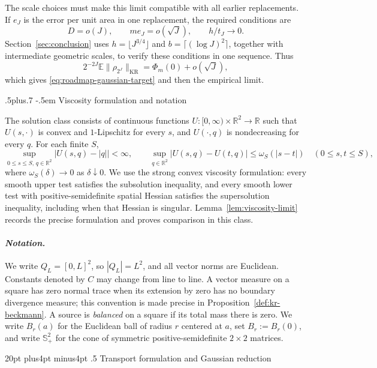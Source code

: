 \documentclass[11pt,reqno]{amsart}
\makeatletter
\def\section{\@startsection{section}{1}{0pt}%
  {20pt plus4pt minus4pt}
  {.5\linespacing}
  {\normalfont\bfseries}}
\def\subsection{\@startsection{subsection}{2}{0pt}%
  {.5\linespacing plus.7\linespacing}
  {-.5em}
  {\normalfont\scshape}}
\theoremstyle{plain}
\theoremstyle{definition}
\theoremstyle{remark}
\numberwithin{equation}{section}
\newcommand{\1}{\mathbf 1}
\newcommand{\KR}{\mathrm{KR}}
\makeatother
\begin{document}
The scale choices must make this limit compatible with all earlier
replacements.  If $e_J$ is the error per unit area in one replacement,
the required conditions are
\[
D=o(J),\qquad m e_J=o(\sqrt J),\qquad h/t_J\longrightarrow0.
\]
Section~\ref{sec:conclusion} uses $h=\lfloor J^{3/4}\rfloor$ and
$b=\lceil(\log J)^2\rceil$, together with intermediate geometric scales,
to verify these conditions in one sequence.  Thus
\[
2^{-2J}\mathbb E\|\rho_{2^J}\|_{\KR}
=\Phi_m(0)+o(\sqrt J),
\]
which gives \eqref{eq:roadmap-gaussian-target} and then the empirical
limit.

\subsection{Viscosity formulation and notation}\label{subsec:solution-class}

The solution class consists of continuous functions
\(U:[0,\infty)\times\mathbb R^2\to\mathbb R\) such that
\(U(s,\cdot)\) is convex and \(1\)-Lipschitz for every \(s\), and
\(U(\cdot,q)\) is nondecreasing for every \(q\).  For each finite \(S\),
\[
\sup_{0\leq s\leq S,\,q\in\mathbb R^2}\bigl|U(s,q)-|q|\bigr|<\infty,
\qquad
\sup_{q\in\mathbb R^2}|U(s,q)-U(t,q)|
\leq\omega_S(|s-t|)\quad(0\leq s,t\leq S),
\]
where \(\omega_S(\delta)\to0\) as \(\delta\downarrow0\).
We use the strong convex viscosity
formulation: every smooth upper test satisfies the subsolution inequality,
and every smooth lower test with positive-semidefinite spatial Hessian
satisfies the supersolution inequality, including when that Hessian is
singular.  Lemma~\ref{lem:viscosity-limit} records the precise formulation and
proves comparison in this class.

\smallskip
\paragraph{\textit{Notation.}}
We write \(Q_L=[0,L]^2\), so \(|Q_L|=L^2\), and all vector norms are
Euclidean.  Constants denoted by \(C\) may change from line to line.  A vector
measure on a square has zero normal trace when its extension by zero has no
boundary divergence measure; this convention is made precise in
Proposition~\ref{def:kr-beckmann}.  A source is \emph{balanced} on a square if
its total mass there is zero.  We write \(B_r(a)\) for the Euclidean ball of
radius \(r\) centered at \(a\), set \(B_r:=B_r(0)\), and write
\(\mathbb S_+^2\) for the cone of symmetric
positive-semidefinite \(2\times2\) matrices.

\section{Transport formulation and Gaussian reduction}\label{sec:transport}
\end{document}
